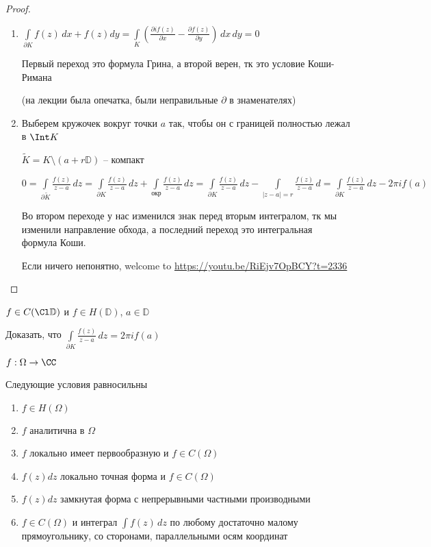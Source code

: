 \begin{proof}\thmslashn
		
	\begin{enumerate}
		\item 
		$\int\limits_{\partial K} f(z)\,dx + f(z)dy = \int\limits_{K}\left( \frac{\partial if(z)}{\partial x} - \frac{\partial f(z)}{\partial y} \right)\,dx\,dy = 0$
		
		Первый переход это формула Грина, а второй верен, тк это условие Коши-Римана 

        (на лекции была опечатка, были неправильные $\partial$ в знаменателях)
		
		\item
		Выберем кружочек вокруг точки $a$ так, чтобы он с границей полностью лежал в $\Int K$
		
		$\tilde{K} = K \setminus(a + r\mathbb{D})$ -- компакт
		
		$0 = \int\limits_{\partial \tilde{K}} \frac{f(z)}{z-a}\,dz = \int\limits_{\partial K} \frac{f(z)}{z-a}\,dz + \int\limits_{\text{окр}} \frac{f(z)}{z-a}\,dz =  \int\limits_{\partial K} \frac{f(z)}{z-a}\,dz - \int\limits_{|z-a| = r} \frac{f(z)}{z-a}\,d = \int\limits_{\partial K} \frac{f(z)}{z-a}\,dz - 2\pi i f(a)$
		
		Во втором переходе у нас изменился знак перед вторым интегралом, тк мы изменили направление обхода, а последний переход это интегральная формула Коши.

        Если ничего непонятно, welcome to \url{https://youtu.be/RiEjv7OpBCY?t=2336}
	\end{enumerate}
	
\end{proof}

\begin{exerc}
	$f\in C(\Cl \mathbb{D})$ и $f \in H(\mathbb{D})$, $a \in \mathbb{D}$
	
	Доказать, что $\int\limits_{\partial K} \frac{f(z)}{z-a}\,dz = 2\pi i f(a)$
\end{exerc}

\begin{theorem}\thmslashn
	
	$f:\Omega \to \CC$ 
	
	Следующие условия равносильны
	
	\begin{enumerate}[1)]
		\item 
		$f\in H(\Omega)$
		\item
		$f$ аналитична в $\Omega$
		\item
            $f$ локально имеет первообразную и $f \in C(\Omega)$
		\item
		$f(z)dz$ локально точная форма и $f \in C(\Omega)$
		\item
		$f(z)dz$ замкнутая форма с непрерывными частными производными 
		\item
		$f\in C(\Omega)$ и интеграл $\int f(z)\,dz$ по любому достаточно малому прямоугольнику, со сторонами, параллельными осям координат
		 
	\end{enumerate}
	
\end{theorem}


